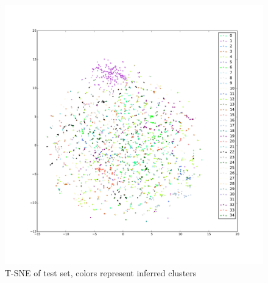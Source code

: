 \documentclass[11pt]{scrartcl}
\begin{document}
\begin{figure}
\centering
\includegraphics[width=\textwidth]{tsne_test_vmf.pdf}
\caption{T-SNE of test set, colors represent inferred clusters}
\label{tsnevmf}
\end{figure}
\end{document}
